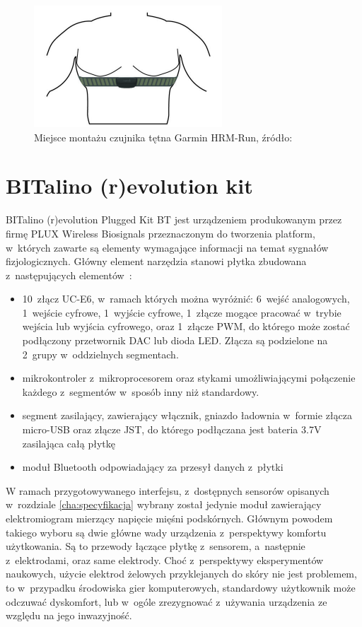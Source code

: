 \begin{figure}
	\centering
	\includegraphics[width=0.5\linewidth]{images/garmin_hrm_placement.png}
	\caption{Miejsce montażu czujnika tętna Garmin HRM-Run, źródło:~\cite{garmin_manual}}
	\label{fig:garmin_placement}
\end{figure}

\section{BITalino (r)evolution kit}
BITalino (r)evolution Plugged Kit BT jest urządzeniem produkowanym przez firmę PLUX Wireless Biosignals przeznaczonym do tworzenia platform, w~których zawarte są elementy wymagające informacji na temat sygnałów fizjologicznych. Główny element narzędzia stanowi płytka zbudowana z~następujących elementów~\cite{bitalino_documentation}:
\begin{itemize}
	\item 10~złącz UC-E6, w~ramach których można wyróżnić: 6~wejść analogowych, 1~wejście cyfrowe, 1~wyjście cyfrowe, 1~złącze mogące pracować w~trybie wejścia lub wyjścia cyfrowego, oraz 1~złącze PWM, do którego może zostać podłączony przetwornik DAC lub dioda LED. Złącza są podzielone na 2~grupy w~oddzielnych segmentach.
	\item mikrokontroler z~mikroprocesorem oraz stykami umożliwiającymi połączenie każdego z~segmentów w~sposób inny niż standardowy.
	\item segment zasilający, zawierający włącznik, gniazdo ładownia w~formie złącza micro-USB oraz złącze JST, do którego podłączana jest bateria 3.7V zasilająca całą płytkę
	\item moduł Bluetooth odpowiadający za przesył danych z~płytki
\end{itemize}

W ramach przygotowywanego interfejsu, z~dostępnych sensorów opisanych w~rozdziale \ref{cha:specyfikacja} wybrany został jedynie moduł zawierający elektromiogram mierzący napięcie mięśni podskórnych. Głównym powodem takiego wyboru są dwie główne wady urządzenia z~perspektywy komfortu użytkowania. Są to przewody łączące płytkę z~sensorem, a~następnie z~elektrodami, oraz same elektrody. Choć z~perspektywy eksperymentów naukowych, użycie elektrod żelowych przyklejanych do skóry nie jest problemem, to w~przypadku środowiska gier komputerowych, standardowy użytkownik może odczuwać dyskomfort, lub w~ogóle zrezygnować z~używania urządzenia ze względu na jego inwazyjność. 

